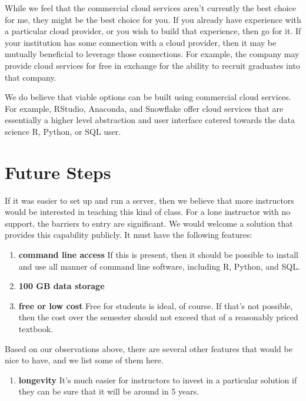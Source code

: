 \documentclass[12pt]{article}
\begin{document}
While we feel that the commercial cloud services aren't currently the best choice for me, they might be the best choice for you.
If you already have experience with a particular cloud provider, or you wish to build that experience, then go for it.
If your institution has some connection with a cloud provider, then it may be mutually beneficial to leverage those connections.
For example, the company may provide cloud services for free in exchange for the ability to recruit graduates into that company.

We do believe that viable options can be built using commercial cloud services.
For example, RStudio, Anaconda, and Snowflake offer cloud services that are essentially a higher level abstraction and user interface catered towards the data science R, Python, or SQL user.

\section{Future Steps}

If it was easier to set up and run a server, then we believe that more instructors would be interested in teaching this kind of class.
For a lone instructor with no support, the barriers to entry are significant.
We would welcome a solution that provides this capability publicly.
It must have the following features:
\begin{enumerate}
\item \textbf{command line access} If this is present, then it should be possible to install and use all manner of command line software, including R, Python, and SQL.
\item \textbf{100 GB data storage} 
\item \textbf{free or low cost} Free for students is ideal, of course.
    If that's not possible, then the cost over the semester should not exceed that of a reasonably priced textbook.
\end{enumerate}
Based on our observations above, there are several other features that would be nice to have, and we list some of them here.

\begin{enumerate}
\item \textbf{longevity} It's much easier for instructors to invest in a particular solution if they can be sure that it will be around in 5 years.
\end{enumerate}



\end{document}

